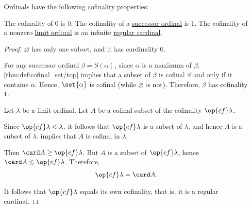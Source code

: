 \begin{proposition}\label{thm:ordinal_cofinality}
  \hyperref[def:ordinal]{Ordinals} have the following \hyperref[def:cofinality]{cofinality} properties:
  \begin{thmenum}
     The cofinality of \( 0 \) is \( 0 \).
     The cofinality of a \hyperref[def:successor_and_limit_ordinal]{successor ordinal} is \( 1 \).
     The cofinality of a nonzero \hyperref[def:successor_and_limit_ordinal]{limit ordinal} is an infinite \hyperref[def:regular_cardinal]{regular cardinal}.
  \end{thmenum}
\end{proposition}
\begin{proof}
   \( \varnothing \) has only one subset, and it has cardinality \( 0 \).

   For any successor ordinal \( \beta = S(\alpha) \), since \( \alpha \) is a maximum of \( \beta \), \cref{thm:def:cofinal_set/top} implies that a subset of \( \beta \) is cofinal if and only if it contains \( \alpha \). Hence, \( \set{ \alpha } \) is cofinal (while \( \varnothing \) is not). Therefore, \( \beta \) has cofinality \( 1 \).

   Let \( \lambda \) be a limit ordinal. Let \( A \) be a cofinal subset of the cofinality \( \op{cf} \lambda \).

  Since \( \op{cf} \lambda < \lambda \), it follows that \( \op{cf} \lambda \) is a subset of \( \lambda \), and hence \( A \) is a subset of \( \lambda \).  implies that \( A \) is cofinal in \( \lambda \).

  Then \( \card A \geq \op{cf} \lambda \). But \( A \) is a subset of \( \op{cf} \lambda \), hence \( \card A \leq \op{cf} \lambda \). Therefore,
  \begin{equation*}
    \op{cf} \lambda = \card A.
  \end{equation*}

  It follows that \( \op{cf} \lambda \) equals its own cofinality, that is, it is a regular cardinal.
\end{proof}

